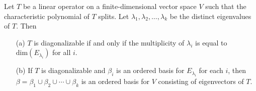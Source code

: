 \begin{theorem}\label{Theorem 5.9}
    Let \( T  \) be a linear operator on a finite-dimensional vector space \( V  \) such that the characteristic polynomial of \( T  \) splits. Let \( {\lambda}_{1}, {\lambda}_{2}, \dots, {\lambda}_{k} \) be the distinct eigenvalues of \( T  \). Then
    \begin{enumerate}
        \item[(a)] \( T  \) is diagonalizable if and only if the multiplicity of \( {\lambda}_{i} \) is equal to \( \text{dim}({E}_{{\lambda}_{i}}) \) for all \( i  \).
        \item[(b)] If \( T  \) is diagonalizable and \( {\beta}_{i} \) is an ordered basis for \( {E}_{{\lambda}_{i}} \) for each \( i  \), then \( \beta = {\beta}_{1} \cup {\beta}_{2} \cup \cdots \cup {\beta}_{k} \) is an ordered basis for \( V  \) consisting of eigenvectors of \( T  \).
    \end{enumerate}
\end{theorem}
